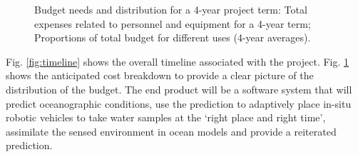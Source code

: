 
\begin{figure}[!h]
  \centering
  \caption{Budget needs and distribution for a 4-year project term:
     Total expenses related to personnel and
    equipment for a 4-year term;  Proportions of
    total budget for different uses (4-year averages).}
  \label{fig:costs}
\end{figure}

Fig. \ref{fig:timeline} shows the overall timeline associated with the
\pro project.  Fig. \ref{fig:costs} shows the anticipated cost
breakdown to provide a clear picture of the distribution of the
budget. The end product will be a software system that will predict
oceanographic conditions, use the prediction to adaptively place
in-situ robotic vehicles to take water samples at the ‘right place and
right time’, assimilate the sensed environment in ocean models and
provide a reiterated prediction.

